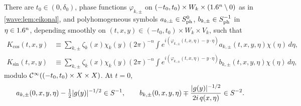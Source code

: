 \begin{theorem}\label{wave:thm:parametrix}
There are $t_0\in(0,\delta_0)$, phase functions $\varphi_{k,\pm}$ on
$(-t_0,t_0)\times W_k\times(1.6^n\setminus0)$ as in \cref{wave:lem:eikonal}, and
polyhomogeneous symbols $a_{k,\pm}\in S^{0}_{\mathrm{ph}}$, $b_{k,\pm}\in S^{-1}_{\mathrm{ph}}$ in
$\eta\in1.6^n$, depending smoothly on $(t,x,y)\in(-t_0,t_0)\times W_k\times V_k$, such that
\begin{align*}
K_{\cos}(t,x,y)&\equiv\sum_{k,\pm}\zeta_k(x)\chi_k(y)(2\pi)^{-n}\int e^{i(\varphi_{k,\pm}(t,x,\eta)-y\cdot\eta)}a_{k,\pm}(t,x,y,\eta)\chi(\eta)\,d\eta,\\
K_{\sin}(t,x,y)&\equiv\sum_{k,\pm}\zeta_k(x)\chi_k(y)(2\pi)^{-n}\int e^{i(\varphi_{k,\pm}(t,x,\eta)-y\cdot\eta)}b_{k,\pm}(t,x,y,\eta)\chi(\eta)\,d\eta,
\end{align*}
modulo $\mathcal{C}^\infty((-t_0,t_0)\times X\times X)$. At $t=0$,
\begin{equation}\label{wave:eq:initial-symbols}
a_{k,\pm}(0,x,y,\eta)-\tfrac12|g(y)|^{-1/2}\in S^{-1},\qquad
b_{k,\pm}(0,x,y,\eta)\mp\frac{|g(y)|^{-1/2}}{2i\,q(x,\eta)}\in S^{-2}.
\end{equation}
\end{theorem}
